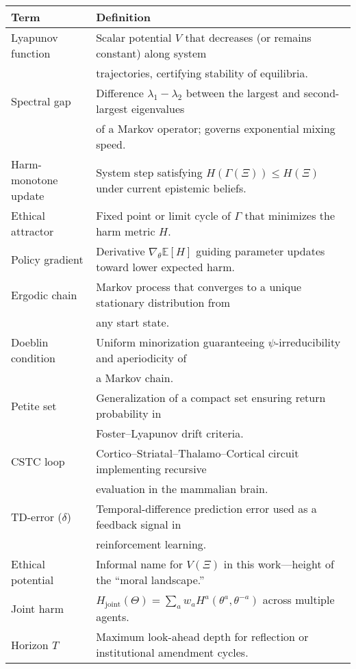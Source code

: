 \begin{table}[htbp!]
\centering
\renewcommand{\arraystretch}{1.15}
\begin{tabular}{@{}lp{}@{}}
\toprule
\textbf{Term} & \textbf{Definition} \\ \midrule
Lyapunov function & Scalar potential $V$ that decreases (or remains constant) along system \\
 & trajectories, certifying stability of equilibria. \\
Spectral gap & Difference $\lambda_1-\lambda_2$ between the largest and second-largest eigenvalues \\
 & of a Markov operator; governs exponential mixing speed. \\
Harm-monotone update & System step satisfying $H(\Gamma(\Xi))\le H(\Xi)$ under current epistemic beliefs. \\
Ethical attractor & Fixed point or limit cycle of $\Gamma$ that minimizes the harm metric $H$. \\
Policy gradient & Derivative $\nabla_\theta \mathbb{E}[H]$ guiding parameter updates toward lower expected harm. \\
Ergodic chain & Markov process that converges to a unique stationary distribution from \\
 & any start state. \\
Doeblin condition & Uniform minorization guaranteeing $\psi$-irreducibility and aperiodicity of \\
 & a Markov chain. \\
Petite set & Generalization of a compact set ensuring return probability in \\
 & Foster–Lyapunov drift criteria. \\
CSTC loop & Cortico–Striatal–Thalamo–Cortical circuit implementing recursive \\
 & evaluation in the mammalian brain. \\
TD-error ($\delta$) & Temporal-difference prediction error used as a feedback signal in \\
 & reinforcement learning. \\
Ethical potential & Informal name for $V(\Xi)$ in this work—height of the “moral landscape.” \\
Joint harm & $H_{\text{joint}}(\Theta)=\sum_a w_a H^a(\theta^a,\theta^{-a})$ across multiple agents. \\
Horizon $T$ & Maximum look-ahead depth for reflection or institutional amendment cycles. \\

\end{tabular}
\end{table}
